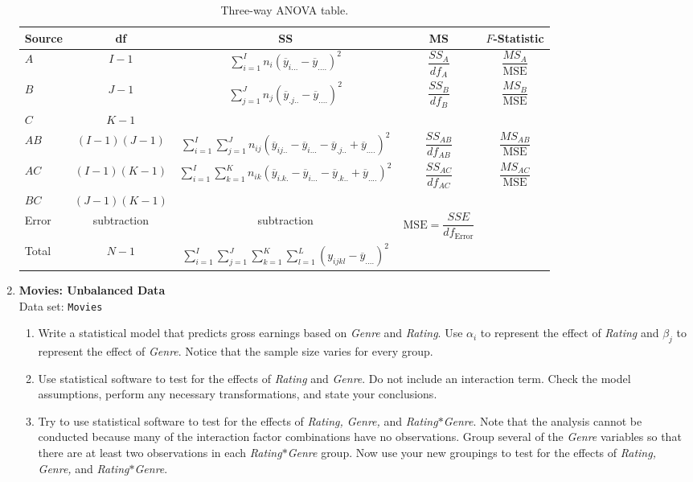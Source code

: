 \documentclass[
]{report}
\begin{document}
\begin{enumerate}
\begin{table}[!h]
\centering
\caption{\label{tab:tab49}Three-way ANOVA table.}
\centering
\begin{tabular}[t]{lcccc}
\toprule
Source & df & SS & MS & $F$-Statistic\\
\midrule
$A$ & $I - 1$ & $\displaystyle\sum_{i=1}^{I} n_i (\overline{y}_{i...} - \overline{y}_{....})^2$ & $\dfrac{SS_A}{df_A}$ & $\dfrac{MS_A}{\text{MSE}}$\\
$B$ & $J - 1$ & $\displaystyle\sum_{j=1}^{J} n_j (\overline{y}_{.j..} - \overline{y}_{....})^2$ & $\dfrac{SS_B}{df_B}$ & $\dfrac{MS_B}{\text{MSE}}$\\
$C$ & $K - 1$ &  &  & \\
$AB$ & $(I-1)(J-1)$ & $\displaystyle\sum_{i=1}^I\sum_{j=1}^J n_{ij}(\overline{y}_{ij..} - \overline{y}_{i...} - \overline{y}_{.j..} + \overline{y}_{....})^2$ & $\dfrac{SS_{AB}}{df_{AB}}$ & $\dfrac{MS_{AB}}{\text{MSE}}$\\
$AC$ & $(I-1)(K-1)$ & $\displaystyle\sum_{i=1}^I\sum_{k=1}^K n_{ik}(\overline{y}_{i.k.} - \overline{y}_{i...} - \overline{y}_{.k..} + \overline{y}_{....})^2$ & $\dfrac{SS_{AC}}{df_{AC}}$ & $\dfrac{MS_{AC}}{\text{MSE}}$\\
\addlinespace
$BC$ & $(J-1)(K-1)$ &  &  & \\
Error & subtraction & subtraction & $\text{MSE} = \dfrac{SSE}{df_{\text{Error}}}$ & \\
Total & $N-1$ & $\displaystyle\sum_{i=1}^I\sum_{j=1}^J\sum_{k=1}^K\sum_{l=1}^L (y_{ijkl} - \overline{y}_{....})^2$ &  & \\
\bottomrule
\end{tabular}
\end{table}

  \item \textbf{Movies: Unbalanced Data}\\
  Data set: \texttt{Movies}
  \begin{enumerate}
    \item Write a statistical model that predicts gross earnings based on \textit{Genre} and \textit{Rating}. Use $\alpha_i$ to represent the effect of \textit{Rating} and $\beta_j$ to represent the effect of \textit{Genre}. Notice that the sample size varies for every group.
    \item Use statistical software to test for the effects of \textit{Rating} and \textit{Genre}. Do not include an interaction term. Check the model assumptions, perform any necessary transformations, and state your conclusions.
    \item Try to use statistical software to test for the effects of \textit{Rating, Genre,} and \textit{Rating$*$Genre}. Note that the analysis cannot be conducted because many of the interaction factor combinations have no observations. Group several of the \textit{Genre} variables so that there are at least two observations in each \textit{Rating$*$Genre} group. Now use your new groupings to test for the effects of \textit{Rating, Genre,} and \textit{Rating$*$Genre}.
  \end{enumerate}


\end{enumerate}
\end{document}
